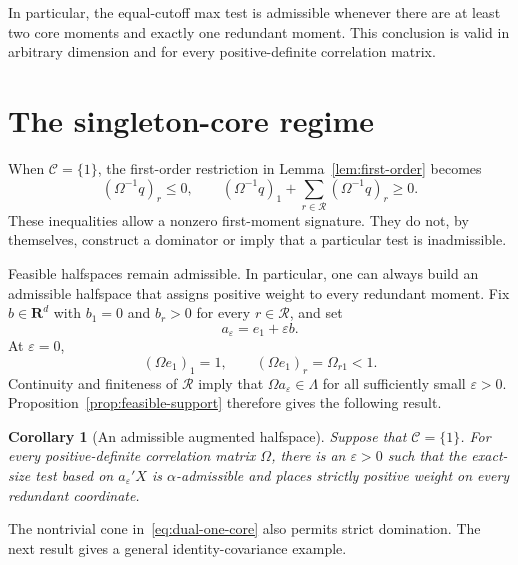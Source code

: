 \documentclass[12pt]{article}
\newtheorem{corollary}[theorem]{Corollary}
\theoremstyle{definition}
\theoremstyle{remark}
\newcommand{\R}{\mathbf R}
\newcommand{\cC}{\mathcal C}
\newcommand{\cR}{\mathcal R}
\newcommand{\1}{\mathbf 1}
\begin{document}
In particular, the equal-cutoff max test is admissible whenever there are at
least two core moments and exactly one redundant moment.  This conclusion is
valid in arbitrary dimension and for every positive-definite correlation
matrix.

\section{The singleton-core regime}

When $\cC=\{1\}$, the first-order restriction in
Lemma~\ref{lem:first-order} becomes
\begin{equation}\label{eq:one-core-q}
(\Omega^{-1}q)_r\le0,
\qquad
(\Omega^{-1}q)_1+
\sum_{r\in\cR}(\Omega^{-1}q)_r\ge0.
\end{equation}
These inequalities allow a nonzero first-moment signature.  They do not, by
themselves, construct a dominator or imply that a particular test is
inadmissible.

Feasible halfspaces remain admissible.  In particular, one can always build
an admissible halfspace that assigns positive weight to every redundant
moment.  Fix $b\in\R^d$ with $b_1=0$ and $b_r>0$ for every
$r\in\cR$, and set
\begin{equation}\label{eq:epsilon-normal}
a_\varepsilon=e_1+\varepsilon b.
\end{equation}
At $\varepsilon=0$,
\[
(\Omega e_1)_1=1,
\qquad
(\Omega e_1)_r=\Omega_{r1}<1.
\]
Continuity and finiteness of $\cR$ imply that
$\Omega a_\varepsilon\in\Lambda$ for all sufficiently small
$\varepsilon>0$.  Proposition~\ref{prop:feasible-support} therefore gives
the following result.

\begin{corollary}[An admissible augmented halfspace]
\label{cor:epsilon}
Suppose that $\cC=\{1\}$.  For every positive-definite correlation matrix
$\Omega$, there is an $\varepsilon>0$ such that the exact-size test based on
$a_\varepsilon'X$ is $\alpha$-admissible and places strictly positive
weight on every redundant coordinate.
\end{corollary}

The nontrivial cone in~\eqref{eq:dual-one-core} also permits strict
domination.  The next result gives a general identity-covariance example.
\end{document}
